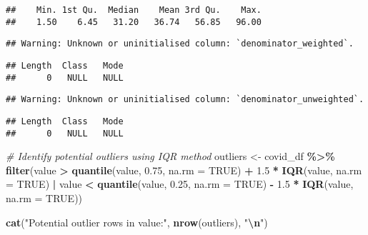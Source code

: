 \documentclass[
]{article}
\newenvironment{Shaded}{\begin{snugshade}}{\end{snugshade}}
\newcommand{\AttributeTok}[1]{\textcolor[rgb]{0.13,0.29,0.53}{#1}}
\newcommand{\CommentTok}[1]{\textcolor[rgb]{0.56,0.35,0.01}{\textit{#1}}}
\newcommand{\ConstantTok}[1]{\textcolor[rgb]{0.56,0.35,0.01}{#1}}
\newcommand{\FloatTok}[1]{\textcolor[rgb]{0.00,0.00,0.81}{#1}}
\newcommand{\FunctionTok}[1]{\textcolor[rgb]{0.13,0.29,0.53}{\textbf{#1}}}
\newcommand{\NormalTok}[1]{#1}
\newcommand{\OtherTok}[1]{\textcolor[rgb]{0.56,0.35,0.01}{#1}}
\newcommand{\SpecialCharTok}[1]{\textcolor[rgb]{0.81,0.36,0.00}{\textbf{#1}}}
\newcommand{\StringTok}[1]{\textcolor[rgb]{0.31,0.60,0.02}{#1}}
\begin{document}
\begin{verbatim}
##    Min. 1st Qu.  Median    Mean 3rd Qu.    Max. 
##    1.50    6.45   31.20   36.74   56.85   96.00
\end{verbatim}

\begin{Shaded}
\end{Shaded}

\begin{verbatim}
## Warning: Unknown or uninitialised column: `denominator_weighted`.
\end{verbatim}

\begin{verbatim}
## Length  Class   Mode 
##      0   NULL   NULL
\end{verbatim}

\begin{Shaded}
\end{Shaded}

\begin{verbatim}
## Warning: Unknown or uninitialised column: `denominator_unweighted`.
\end{verbatim}

\begin{verbatim}
## Length  Class   Mode 
##      0   NULL   NULL
\end{verbatim}

\begin{Shaded}
\begin{Highlighting}[]
\CommentTok{\# Identify potential outliers using IQR method}
\NormalTok{outliers }\OtherTok{\textless{}{-}}\NormalTok{ covid\_df }\SpecialCharTok{\%\textgreater{}\%}
  \FunctionTok{filter}\NormalTok{(value }\SpecialCharTok{\textgreater{}} \FunctionTok{quantile}\NormalTok{(value, }\FloatTok{0.75}\NormalTok{, }\AttributeTok{na.rm =} \ConstantTok{TRUE}\NormalTok{) }\SpecialCharTok{+} \FloatTok{1.5} \SpecialCharTok{*} \FunctionTok{IQR}\NormalTok{(value, }\AttributeTok{na.rm =} \ConstantTok{TRUE}\NormalTok{) }\SpecialCharTok{|}
\NormalTok{         value }\SpecialCharTok{\textless{}} \FunctionTok{quantile}\NormalTok{(value, }\FloatTok{0.25}\NormalTok{, }\AttributeTok{na.rm =} \ConstantTok{TRUE}\NormalTok{) }\SpecialCharTok{{-}} \FloatTok{1.5} \SpecialCharTok{*} \FunctionTok{IQR}\NormalTok{(value, }\AttributeTok{na.rm =} \ConstantTok{TRUE}\NormalTok{))}

\FunctionTok{cat}\NormalTok{(}\StringTok{"Potential outlier rows in \textquotesingle{}value\textquotesingle{}:"}\NormalTok{, }\FunctionTok{nrow}\NormalTok{(outliers), }\StringTok{"}\SpecialCharTok{\textbackslash{}n}\StringTok{"}\NormalTok{)}
\end{Highlighting}
\end{Shaded}
\end{document}
